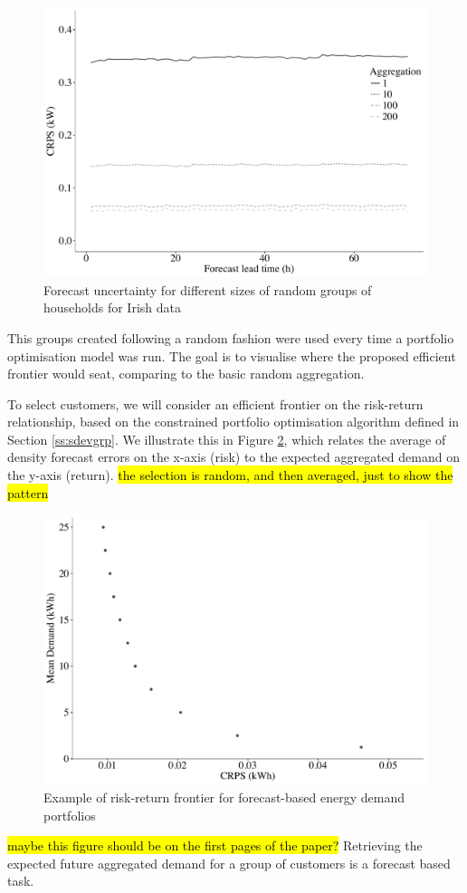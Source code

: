 \documentclass[preprint,3p,12pt,authoryear]{elsarticle}
\begin{document}
\begin{figure}
  \centering
  \includegraphics[width=0.8\columnwidth]{2017-12-27_rndgrp_IR}
  \caption{Forecast uncertainty for different sizes of random groups of households for Irish data}
  \label{fig:rndgrpIR}
\end{figure}

This groups created following a random fashion were used every time a portfolio optimisation model was run.
The goal is to visualise where the proposed efficient frontier would seat, comparing to the basic random aggregation.

To select customers, we will consider an efficient frontier on the risk-return relationship, based on the constrained portfolio optimisation algorithm defined in Section \ref{ss:sdevgrp}. We illustrate this in Figure \ref{fig:portoptex}, which relates the average of density forecast errors on the x-axis (risk) to the expected aggregated demand on the y-axis (return). \hl{the selection is random, and then averaged, just to show the pattern}

\begin{figure}
  \centering
  \includegraphics[width=0.8\columnwidth]{2017-11-15_randomgrouping}
  \caption{Example of risk-return frontier for forecast-based energy demand portfolios}
  \label{fig:portoptex}
\end{figure}
\hl{maybe this figure should be on the first pages of the paper?}
Retrieving the expected future aggregated demand for a group of customers is a forecast based task.
\end{document}
